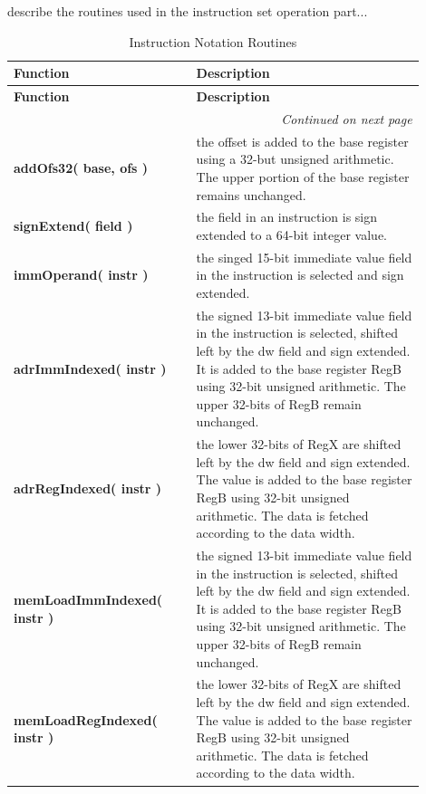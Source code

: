 
describe the routines used in the instruction set operation part...

\begin{center}
\begin{longtable}{@{}p{0.4\linewidth}p{0.5\linewidth}@{}}
    \caption{Instruction Notation Routines} \\
    \toprule
    \textbf{Function} & \textbf{Description} \\
    \midrule
    \endfirsthead
    \toprule
    \textbf{Function} & \textbf{Description} \\
    \midrule
    \endhead
    \midrule
    \multicolumn{2}{r}{\textit{Continued on next page}} \\
    \midrule
    \endfoot
    \bottomrule
    \endlastfoot
    \textbf{addOfs32( base, ofs ) } & the offset is added to the base register using a 32-but unsigned arithmetic. The upper portion of the base register remains unchanged. \\
    \midrule
    \textbf{signExtend( field ) } & the field in an instruction is sign extended to a 64-bit integer value. \\
    \midrule
    \textbf{immOperand( instr ) } & the singed 15-bit immediate value field in the instruction is selected and sign extended. \\
    \midrule
    \textbf{adrImmIndexed( instr ) } & the signed 13-bit immediate value field in the instruction is selected, shifted left by the dw field and sign extended. It is added to the base register RegB using 32-bit unsigned arithmetic. The upper 32-bits of RegB remain unchanged.\\
    \midrule
    \textbf{adrRegIndexed( instr ) } & the lower 32-bits of RegX are shifted left by the dw field and sign extended. The value is added to the base register RegB using 32-bit unsigned arithmetic. The data is fetched according to the data width.\\
    \midrule
    \textbf{memLoadImmIndexed( instr ) } & the signed 13-bit immediate value field in the instruction is selected, shifted left by the dw field and sign extended. It is added to the base register RegB using 32-bit unsigned arithmetic. The upper 32-bits of RegB remain unchanged.\\
    \midrule
    \textbf{memLoadRegIndexed( instr ) } & the lower 32-bits of RegX are shifted left by the dw field and sign extended. The value is added to the base register RegB using 32-bit unsigned arithmetic. The data is fetched according to the data width.\\

\end{longtable}
\end{center}
